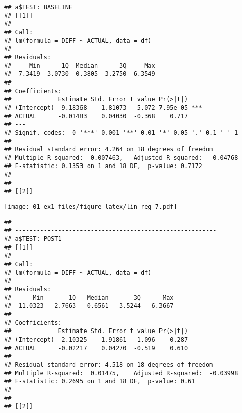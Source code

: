 \documentclass[]{book}
\newenvironment{Shaded}{\begin{snugshade}}{\end{snugshade}}
\newcommand{\CommentTok}[1]{\textcolor[rgb]{0.56,0.35,0.01}{\textit{#1}}}
\newcommand{\ControlFlowTok}[1]{\textcolor[rgb]{0.13,0.29,0.53}{\textbf{#1}}}
\newcommand{\DataTypeTok}[1]{\textcolor[rgb]{0.13,0.29,0.53}{#1}}
\newcommand{\KeywordTok}[1]{\textcolor[rgb]{0.13,0.29,0.53}{\textbf{#1}}}
\newcommand{\NormalTok}[1]{#1}
\newcommand{\OperatorTok}[1]{\textcolor[rgb]{0.81,0.36,0.00}{\textbf{#1}}}
\newcommand{\StringTok}[1]{\textcolor[rgb]{0.31,0.60,0.02}{#1}}
\begin{document}
\begin{Shaded}
\end{Shaded}

\begin{verbatim}
## a$TEST: BASELINE
## [[1]]
## 
## Call:
## lm(formula = DIFF ~ ACTUAL, data = df)
## 
## Residuals:
##     Min      1Q  Median      3Q     Max 
## -7.3419 -3.0730  0.3805  3.2750  6.3549 
## 
## Coefficients:
##             Estimate Std. Error t value Pr(>|t|)    
## (Intercept) -9.18368    1.81073  -5.072 7.95e-05 ***
## ACTUAL      -0.01483    0.04030  -0.368    0.717    
## ---
## Signif. codes:  0 '***' 0.001 '**' 0.01 '*' 0.05 '.' 0.1 ' ' 1
## 
## Residual standard error: 4.264 on 18 degrees of freedom
## Multiple R-squared:  0.007463,   Adjusted R-squared:  -0.04768 
## F-statistic: 0.1353 on 1 and 18 DF,  p-value: 0.7172
## 
## 
## [[2]]
\end{verbatim}

\texttt{[image: 01-ex1\_files/figure-latex/lin-reg-7.pdf]}

\begin{verbatim}
## 
## -------------------------------------------------------- 
## a$TEST: POST1
## [[1]]
## 
## Call:
## lm(formula = DIFF ~ ACTUAL, data = df)
## 
## Residuals:
##      Min       1Q   Median       3Q      Max 
## -11.0323  -2.7663   0.6561   3.5244   6.3667 
## 
## Coefficients:
##             Estimate Std. Error t value Pr(>|t|)
## (Intercept) -2.10325    1.91861  -1.096    0.287
## ACTUAL      -0.02217    0.04270  -0.519    0.610
## 
## Residual standard error: 4.518 on 18 degrees of freedom
## Multiple R-squared:  0.01475,    Adjusted R-squared:  -0.03998 
## F-statistic: 0.2695 on 1 and 18 DF,  p-value: 0.61
## 
## 
## [[2]]
\end{verbatim}
\end{document}
